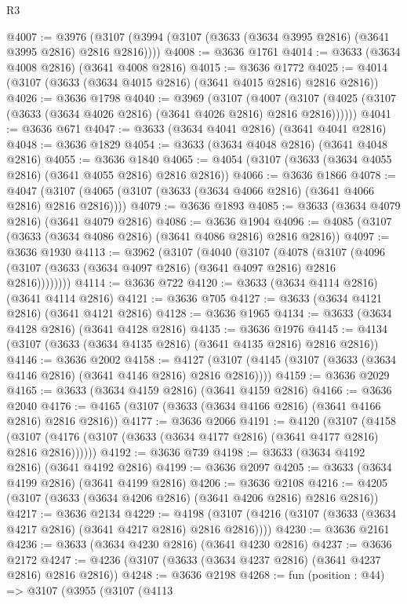\begin{lexlean}{R3}
\begin{coremodule}
@4007 := @3976 (@3107 (@3994 (@3107 (@3633 (@3634 @3995 @2816) (@3641 @3995 @2816) @2816 @2816))))
@4008 := @3636 @1761
@4014 := @3633 (@3634 @4008 @2816) (@3641 @4008 @2816)
@4015 := @3636 @1772
@4025 := @4014 (@3107 (@3633 (@3634 @4015 @2816) (@3641 @4015 @2816) @2816 @2816))
@4026 := @3636 @1798
@4040 := @3969
    (@3107
      (@4007 (@3107 (@4025 (@3107 (@3633 (@3634 @4026 @2816) (@3641 @4026 @2816) @2816 @2816))))))
@4041 := @3636 @671
@4047 := @3633 (@3634 @4041 @2816) (@3641 @4041 @2816)
@4048 := @3636 @1829
@4054 := @3633 (@3634 @4048 @2816) (@3641 @4048 @2816)
@4055 := @3636 @1840
@4065 := @4054 (@3107 (@3633 (@3634 @4055 @2816) (@3641 @4055 @2816) @2816 @2816))
@4066 := @3636 @1866
@4078 := @4047 (@3107 (@4065 (@3107 (@3633 (@3634 @4066 @2816) (@3641 @4066 @2816) @2816 @2816))))
@4079 := @3636 @1893
@4085 := @3633 (@3634 @4079 @2816) (@3641 @4079 @2816)
@4086 := @3636 @1904
@4096 := @4085 (@3107 (@3633 (@3634 @4086 @2816) (@3641 @4086 @2816) @2816 @2816))
@4097 := @3636 @1930
@4113 := @3962
    (@3107
      (@4040
        (@3107
          (@4078
            (@3107 (@4096 (@3107 (@3633 (@3634 @4097 @2816) (@3641 @4097 @2816) @2816 @2816))))))))
@4114 := @3636 @722
@4120 := @3633 (@3634 @4114 @2816) (@3641 @4114 @2816)
@4121 := @3636 @705
@4127 := @3633 (@3634 @4121 @2816) (@3641 @4121 @2816)
@4128 := @3636 @1965
@4134 := @3633 (@3634 @4128 @2816) (@3641 @4128 @2816)
@4135 := @3636 @1976
@4145 := @4134 (@3107 (@3633 (@3634 @4135 @2816) (@3641 @4135 @2816) @2816 @2816))
@4146 := @3636 @2002
@4158 := @4127 (@3107 (@4145 (@3107 (@3633 (@3634 @4146 @2816) (@3641 @4146 @2816) @2816 @2816))))
@4159 := @3636 @2029
@4165 := @3633 (@3634 @4159 @2816) (@3641 @4159 @2816)
@4166 := @3636 @2040
@4176 := @4165 (@3107 (@3633 (@3634 @4166 @2816) (@3641 @4166 @2816) @2816 @2816))
@4177 := @3636 @2066
@4191 := @4120
    (@3107
      (@4158 (@3107 (@4176 (@3107 (@3633 (@3634 @4177 @2816) (@3641 @4177 @2816) @2816 @2816))))))
@4192 := @3636 @739
@4198 := @3633 (@3634 @4192 @2816) (@3641 @4192 @2816)
@4199 := @3636 @2097
@4205 := @3633 (@3634 @4199 @2816) (@3641 @4199 @2816)
@4206 := @3636 @2108
@4216 := @4205 (@3107 (@3633 (@3634 @4206 @2816) (@3641 @4206 @2816) @2816 @2816))
@4217 := @3636 @2134
@4229 := @4198 (@3107 (@4216 (@3107 (@3633 (@3634 @4217 @2816) (@3641 @4217 @2816) @2816 @2816))))
@4230 := @3636 @2161
@4236 := @3633 (@3634 @4230 @2816) (@3641 @4230 @2816)
@4237 := @3636 @2172
@4247 := @4236 (@3107 (@3633 (@3634 @4237 @2816) (@3641 @4237 @2816) @2816 @2816))
@4248 := @3636 @2198
@4268 := fun (position : @44) =>
  @3107
    (@3955
      (@3107
        (@4113

\end{coremodule}
\end{lexlean}
